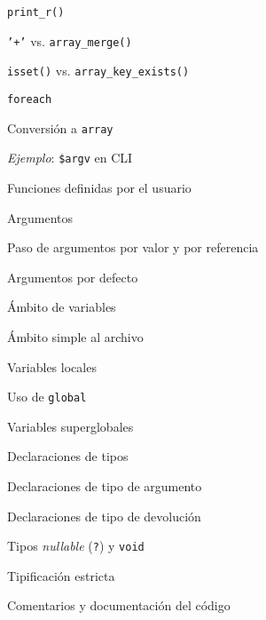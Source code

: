 \begin{longenum}
\begin{longenum}
\begin{longenum}
\begin{longenum}
                \item \texttt{print\_r()}
                \item \texttt{'+'} vs. \texttt{array\_merge()}
                \item \texttt{isset()} vs. \texttt{array\_key\_exists()}
            \end{longenum}
            \item \texttt{foreach}
            \item Conversión a \texttt{array} 
            \item \textit{Ejemplo}: \texttt{\$argv} en CLI
        \end{longenum}
        \item Funciones definidas por el usuario
        \begin{longenum}
            \item Argumentos
            \begin{longenum}
                \item Paso de argumentos por valor y por referencia
                \item Argumentos por defecto
            \end{longenum}
            \item Ámbito de variables
            \begin{longenum}
                \item Ámbito simple al archivo
                \item Variables locales
                \item Uso de \texttt{global}
                \item Variables superglobales
            \end{longenum}
            \item Declaraciones de tipos
            \begin{longenum}
                \item Declaraciones de tipo de argumento
                \item Declaraciones de tipo de devolución
                \item Tipos \textit{nullable} (\texttt{?}) y \texttt{void}
                \item Tipificación estricta
            \end{longenum}
        \end{longenum}
        \item Comentarios y documentación del código
    \end{longenum}

\end{longenum}
